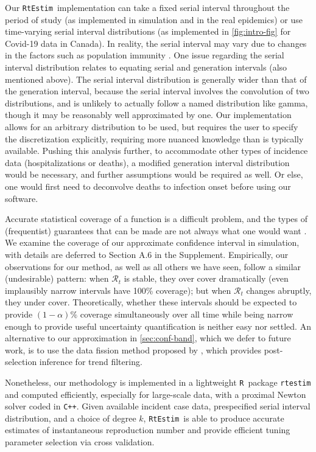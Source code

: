 \documentclass[10pt,letterpaper]{article}
\newcommand{\R}{\texttt{R}}
\newcommand{\cpp}{\texttt{C++}}
\def\RtEstim{\texttt{RtEstim}}
\begin{document}
Our \RtEstim\ implementation can take a fixed serial interval throughout the
period of study (as implemented in simulation and in the real epidemics) or 
use time-varying serial interval distributions (as implemented 
in \autoref{fig:intro-fig} for Covid-19 data in Canada). In reality, the serial
interval may vary due to changes in the factors such as population immunity 
\cite{nash2023estimating}. One issue regarding the serial interval distribution 
relates to equating serial and generation intervals (also mentioned above). 
The serial interval distribution is generally wider than that 
of the generation interval, because the serial interval involves the convolution
of two distributions, and is unlikely to actually follow a named distribution
like gamma, though it may be reasonably well approximated by one. Our
implementation allows for an arbitrary distribution to be used, but requires the
user to specify the discretization explicitly, requiring more nuanced knowledge
than is typically available. Pushing this analysis further, to accommodate other
types of incidence data (hospitalizations or deaths), a modified generation
interval distribution would be necessary, and further assumptions would be
required as well. Or else, one would first need to deconvolve deaths to
infection onset before using our software.


Accurate statistical coverage of a function is a difficult problem, and the
types of (frequentist) guarantees that can be made are not always what one would
want \cite{genovese2008adaptive}. We examine the coverage of our approximate
confidence interval in simulation, with details are deferred to Section A.6 in
the Supplement. Empirically, our observations for our method, as well as all
others we have seen, follow a similar (undesirable) pattern: when
$\mathcal{R}_t$ is stable, they over cover dramatically (even implausibly narrow
intervals have 100\% coverage); but when $\mathcal{R}_t$ changes abruptly, they
under cover. Theoretically, whether these intervals should be expected to
provide $(1-\alpha)\%$ coverage simultaneously over all time while being narrow
enough to provide useful uncertainty quantification is neither easy nor settled.
An alternative to our approximation in \autoref{sec:conf-band}, which we defer
to future work, is to use the data fission method proposed by
\cite{leiner2023data}, which provides post-selection inference for trend
filtering.


Nonetheless, our methodology is implemented in a lightweight \R\ package
\texttt{rtestim} and computed efficiently, especially for large-scale data, with
a proximal Newton solver coded in \cpp. Given available incident case data,
prespecified serial interval distribution, and a choice of degree $k$, \RtEstim\
is able to produce accurate estimates of instantaneous reproduction number and
provide efficient tuning parameter selection via cross validation. 
\end{document}
